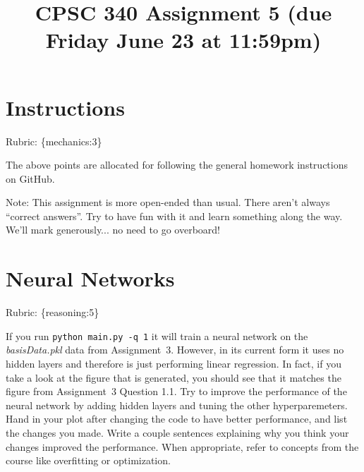 \documentclass{article}
\begin{document}
\def\blu#1{{\color{blu}#1}}
\def\gre#1{{\color{gre}#1}}
\def\red#1{{\color{red}#1}}
\def\norm#1{\|#1\|}
\newcommand{\argmin}[1]{\mathop{\hbox{argmin}}_{#1}}
\newcommand{\argmax}[1]{\mathop{\hbox{argmax}}_{#1}}
\def\R{\mathbb{R}}
\newcommand{\fig}[2]{\texttt{[image: \#2]}}
\newcommand{\centerfig}[2]{\begin{center}\texttt{[image: \#2]}\end{center}}
\def\items#1{\begin{itemize}#1\end{itemize}}
\def\enum#1{\begin{enumerate}#1\end{enumerate}}
\newcommand{\code}[1]{}
\newcommand{\half}{\frac 1 2}
\def\argmax{\mathop{\rm arg\,max}}
\def\argmin{\mathop{\rm arg\,min}}
\def\rubric#1{\gre{Rubric: \{#1\}}}{}


\title{CPSC 340 Assignment 5 (due Friday June 23 at 11:59pm)}
\date{}
\maketitle

\vspace{-7em}
\section*{Instructions}
\rubric{mechanics:3}

The above points are allocated for following the general homework instructions on GitHub.

\vspace{1em}

Note: This assignment is more open-ended than usual. There aren't always ``correct answers''. 
Try to have fun with it and learn something along the way. 
We'll mark generously... no need to go overboard!



\section{Neural Networks}
\rubric{reasoning:5}

If you run \texttt{python main.py -q 1} it will train a neural network on the \emph{basisData.pkl} data from Assignment~3. 
However, in its current form it uses no hidden layers and therefore is just performing linear regression.
In fact, if you take a look at the figure that is generated, you should see that it matches the figure
from Assignment~3 Question 1.1. 
Try to improve the performance of the neural network by adding hidden layers and tuning the other hyperparemeters. 
\blu{Hand in your plot after changing the code to have better performance, and list the changes you made. Write a couple sentences
explaining why you think your changes improved the performance. When appropriate, refer to concepts from the course like overfitting
or optimization.}
\end{document}
